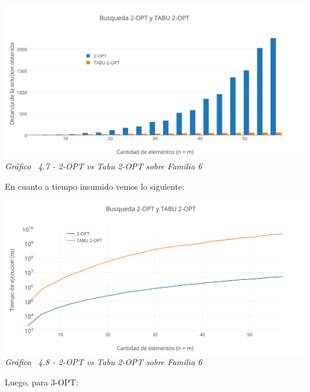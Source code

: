 \vspace*{0.3cm} \vspace*{0.3cm}
  \begin{center}
 \includegraphics[scale=0.5]{./EJ4/comparativosinorden2opt.png}\\
 {            \textit{Gráfico \ 4.7 - 2-OPT vs Tabu 2-OPT sobre Familia 6}}
  \end{center}
  \vspace*{0.3cm}

En cuanto a tiempo insumido vemos lo siguiente:

\vspace*{0.3cm} \vspace*{0.3cm}
  \begin{center}
 \includegraphics[scale=0.5]{./EJ4/medicion2optsinorden.png}\\
 {            \textit{Gráfico \ 4.8 - 2-OPT vs Tabu 2-OPT sobre Familia 6}}
  \end{center}
  \vspace*{0.3cm}


Luego, para 3-OPT:

